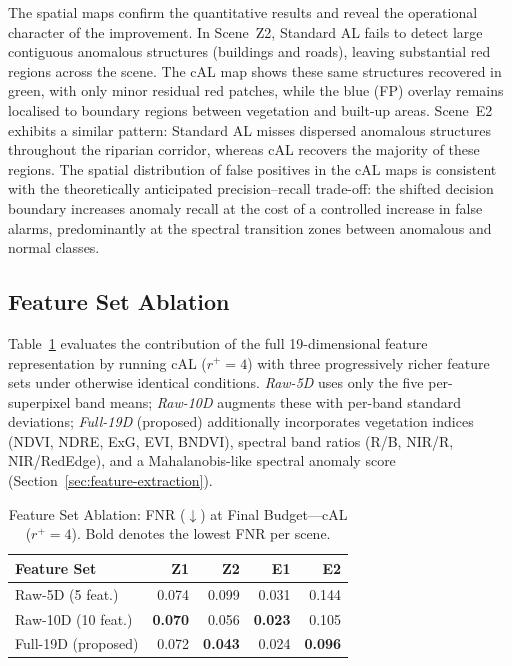 \documentclass[lettersize,journal]{IEEEtran}
\begin{document}
The spatial maps confirm the quantitative results and reveal the
operational character of the improvement. In Scene~Z2, Standard AL
fails to detect large contiguous anomalous structures (buildings and
roads), leaving substantial red regions across the scene. The cAL
map shows these same structures recovered in green, with only minor
residual red patches, while the blue (FP) overlay remains localised
to boundary regions between vegetation and built-up areas. Scene~E2
exhibits a similar pattern: Standard AL misses dispersed anomalous
structures throughout the riparian corridor, whereas cAL recovers
the majority of these regions. The spatial distribution of false
positives in the cAL maps is consistent with the theoretically
anticipated precision--recall trade-off: the shifted decision boundary
increases anomaly recall at the cost of a controlled increase in false
alarms, predominantly at the spectral transition zones between
anomalous and normal classes.


\subsection{Feature Set Ablation}
\label{sec:ablation}

Table~\ref{tab:ablation} evaluates the contribution of the full 19-dimensional
feature representation by running cAL ($r^{+}=4$) with three progressively
richer feature sets under otherwise identical conditions.
\textit{Raw-5D} uses only the five per-superpixel band means;
\textit{Raw-10D} augments these with per-band standard deviations;
\textit{Full-19D} (proposed) additionally incorporates vegetation indices
(NDVI, NDRE, ExG, EVI, BNDVI), spectral band ratios (R/B, NIR/R,
NIR/RedEdge), and a Mahalanobis-like spectral anomaly score
(Section~\ref{sec:feature-extraction}).

\begin{table}[t]
\footnotesize
\centering
\caption{Feature Set Ablation: FNR ($\downarrow$) at Final Budget---cAL ($r^{+}=4$).
         Bold denotes the lowest FNR per scene.}
\begin{tabular}{l r r r r}
    \toprule
    \textbf{Feature Set} & \textbf{Z1} & \textbf{Z2} & \textbf{E1} & \textbf{E2} \\
    \midrule
    Raw-5D  (5 feat.)    & 0.074 & 0.099 & 0.031 & 0.144 \\
    Raw-10D (10 feat.)   & \textbf{0.070} & 0.056 & \textbf{0.023} & 0.105 \\
    Full-19D (proposed)  & 0.072 & \textbf{0.043} & 0.024 & \textbf{0.096} \\
    \bottomrule
\end{tabular}
\label{tab:ablation}
\end{table}
\end{document}
